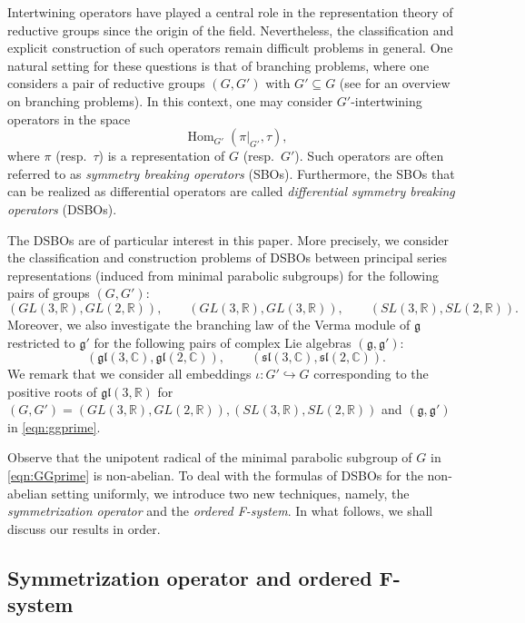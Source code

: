 \documentclass[a4paper,11pt,reqno]{amsart}
\newcommand{\frakg}{\mathfrak{g}}
\newcommand{\0}{{\bf 0}}
\newcommand{\R}{\mathbb{R}}
\newcommand{\C}{\mathbb{C}}
\newcommand{\1}{{\bf 1}}
\DeclareMathOperator{\Hom}{Hom}
\theoremstyle{plain}
\theoremstyle{definition}
\numberwithin{equation}{section}
\theoremstyle{definition}
\begin{document}
Intertwining operators have played a central role in the representation theory of reductive groups since the origin of the field. 
Nevertheless, the classification and explicit construction of such operators remain difficult problems in general. One natural setting for these questions is that of branching problems, where one considers a pair of reductive groups $(G,G')$ with $G'\subseteq G$ (see \cite{Ko24} for an overview on branching problems). In this context, one may consider 
$G'$-intertwining operators in the space
\[
\Hom_{G'}(\pi|_{G'},\tau),
\]
where $\pi$ (resp.\ $\tau$) is a representation of $G$ (resp.\ $G'$). Such operators are often referred to as \emph{symmetry breaking operators} (SBOs). 
Furthermore, the SBOs that can be realized as differential operators 
are called
\emph{differential symmetry breaking operators} (DSBOs).

The DSBOs are of particular interest in this paper. More precisely,
we consider the classification and construction problems of DSBOs between principal
series representations (induced from minimal parabolic subgroups) for the following pairs of groups  $(G,G')$:
\begin{equation}\label{eqn:GGprime}
(GL(3,\R), GL(2,\R)),
\qquad
(GL(3,\R), GL(3,\R)),
\qquad
(SL(3,\R), SL(2,\R)).
\end{equation}
Moreover, we also investigate the branching law of 
the Verma module of $\frakg$ restricted to $\frakg'$
for the following pairs of 
complex Lie algebras $(\frakg, \frakg')$:
\begin{equation}\label{eqn:ggprime}
(\mathfrak{gl}(3,\C), \mathfrak{gl}(2,\C)),
\qquad
(\mathfrak{sl}(3,\C), \mathfrak{sl}(2,\C)).
\end{equation}
We remark that we consider all embeddings 
$\iota \colon G' \hookrightarrow G$ 
corresponding to the positive roots of $\mathfrak{gl}(3,\R)$
for $(G, G')=(GL(3,\R), GL(2,\R)),(SL(3,\R), SL(2,\R))$
and $(\frakg, \frakg')$ in \eqref{eqn:ggprime}.


Observe that the unipotent radical of the  minimal parabolic subgroup of $G$
in \eqref{eqn:GGprime} is non-abelian.
To deal with the formulas of DSBOs for the non-abelian setting uniformly,
we introduce two new techniques, namely, 
the \emph{symmetrization operator} and the \emph{ordered F-system}.
In what follows, we shall discuss our results in order.

\subsection{Symmetrization operator and ordered F-system}
\end{document}
